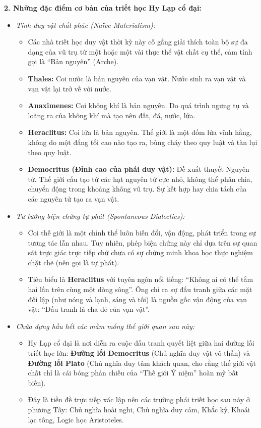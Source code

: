 \documentclass[12pt,a4paper]{article}
\begin{document}
\noindent
\textbf{2. Những đặc điểm cơ bản của triết học Hy Lạp cổ đại:}
\begin{itemize}
    \item \textit{Tính duy vật chất phác (Na\"{i}ve Materialism):}
    \begin{itemize}
        \item Các nhà triết học duy vật thời kỳ này cố gắng giải thích toàn bộ sự đa dạng của vũ trụ từ một hoặc một vài thực thể vật chất cụ thể, cảm tính gọi là ``Bản nguyên'' (Arche).
        \item \textbf{Thales:} Coi nước là bản nguyên của vạn vật. Nước sinh ra vạn vật và vạn vật lại trở về với nước.
        \item \textbf{Anaximenes:} Coi không khí là bản nguyên. Do quá trình ngưng tụ và loãng ra của không khí mà tạo nên đất, đá, nước, lửa.
        \item \textbf{Heraclitus:} Coi lửa là bản nguyên. Thế giới là một đốm lửa vĩnh hằng, không do một đấng tối cao nào tạo ra, bùng cháy theo quy luật và tàn lụi theo quy luật.
        \item \textbf{Democritus (Đỉnh cao của phái duy vật):} Đề xuất thuyết Nguyên tử. Thế giới cấu tạo từ các hạt nguyên tử cực nhỏ, không thể phân chia, chuyển động trong khoảng không vũ trụ. Sự kết hợp hay chia tách của các nguyên tử tạo ra vạn vật.
    \end{itemize}
    \item \textit{Tư tưởng biện chứng tự phát (Spontaneous Dialectics):}
    \begin{itemize}
        \item Coi thế giới là một chỉnh thể luôn biến đổi, vận động, phát triển trong sự tương tác lẫn nhau. Tuy nhiên, phép biện chứng này chỉ dựa trên sự quan sát trực giác trực tiếp chứ chưa có sự chứng minh khoa học thực nghiệm chặt chẽ (nên gọi là tự phát).
        \item Tiêu biểu là \textbf{Heraclitus} với tuyên ngôn nổi tiếng: ``Không ai có thể tắm hai lần trên cùng một dòng sông''. Ông chỉ ra sự đấu tranh giữa các mặt đối lập (như nóng và lạnh, sáng và tối) là nguồn gốc vận động của vạn vật: ``Đấu tranh là cha đẻ của vạn vật''.
    \end{itemize}
    \item \textit{Chứa đựng hầu hết các mầm mống thế giới quan sau này:}
    \begin{itemize}
        \item Hy Lạp cổ đại là nơi diễn ra cuộc đấu tranh quyết liệt giữa hai đường lối triết học lớn: \textbf{Đường lối Democritus} (Chủ nghĩa duy vật vô thần) và \textbf{Đường lối Plato} (Chủ nghĩa duy tâm khách quan, cho rằng thế giới vật chất chỉ là cái bóng phản chiếu của ``Thế giới Ý niệm'' hoàn mỹ bất biến).
        \item Đây là tiền đề trực tiếp xác lập nên các trường phái triết học sau này ở phương Tây: Chủ nghĩa hoài nghi, Chủ nghĩa duy cảm, Khắc kỷ, Khoái lạc tông, Logic học Aristoteles.
    \end{itemize}
\end{itemize}
\end{document}
